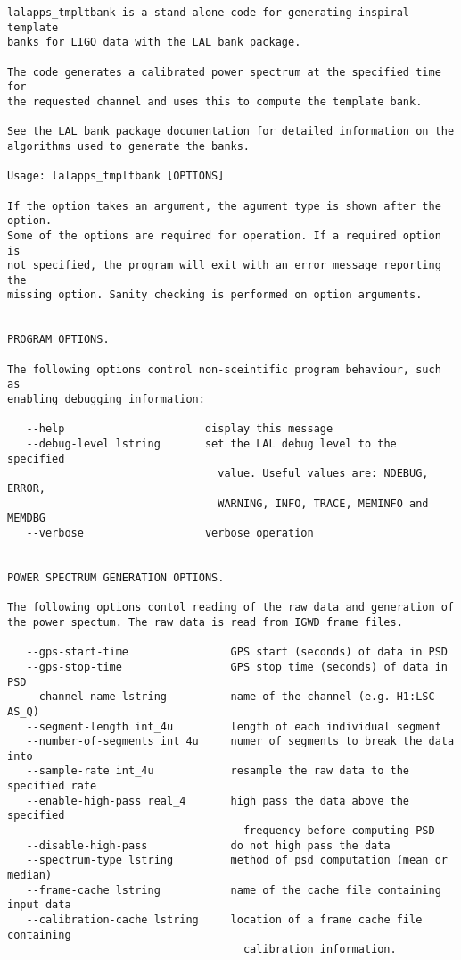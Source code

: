 \begin{verbatim}
lalapps_tmpltbank is a stand alone code for generating inspiral template
banks for LIGO data with the LAL bank package.

The code generates a calibrated power spectrum at the specified time for
the requested channel and uses this to compute the template bank.

See the LAL bank package documentation for detailed information on the
algorithms used to generate the banks.

Usage: lalapps_tmpltbank [OPTIONS]

If the option takes an argument, the agument type is shown after the option.
Some of the options are required for operation. If a required option is
not specified, the program will exit with an error message reporting the
missing option. Sanity checking is performed on option arguments.


PROGRAM OPTIONS.

The following options control non-sceintific program behaviour, such as
enabling debugging information:

   --help                      display this message
   --debug-level lstring       set the LAL debug level to the specified
                                 value. Useful values are: NDEBUG, ERROR,
                                 WARNING, INFO, TRACE, MEMINFO and MEMDBG
   --verbose                   verbose operation


POWER SPECTRUM GENERATION OPTIONS.

The following options contol reading of the raw data and generation of 
the power spectum. The raw data is read from IGWD frame files.

   --gps-start-time                GPS start (seconds) of data in PSD
   --gps-stop-time                 GPS stop time (seconds) of data in PSD
   --channel-name lstring          name of the channel (e.g. H1:LSC-AS_Q)
   --segment-length int_4u         length of each individual segment
   --number-of-segments int_4u     numer of segments to break the data into
   --sample-rate int_4u            resample the raw data to the specified rate
   --enable-high-pass real_4       high pass the data above the specified
                                     frequency before computing PSD
   --disable-high-pass             do not high pass the data
   --spectrum-type lstring         method of psd computation (mean or median)
   --frame-cache lstring           name of the cache file containing input data
   --calibration-cache lstring     location of a frame cache file containing
                                     calibration information.



\end{verbatim}
